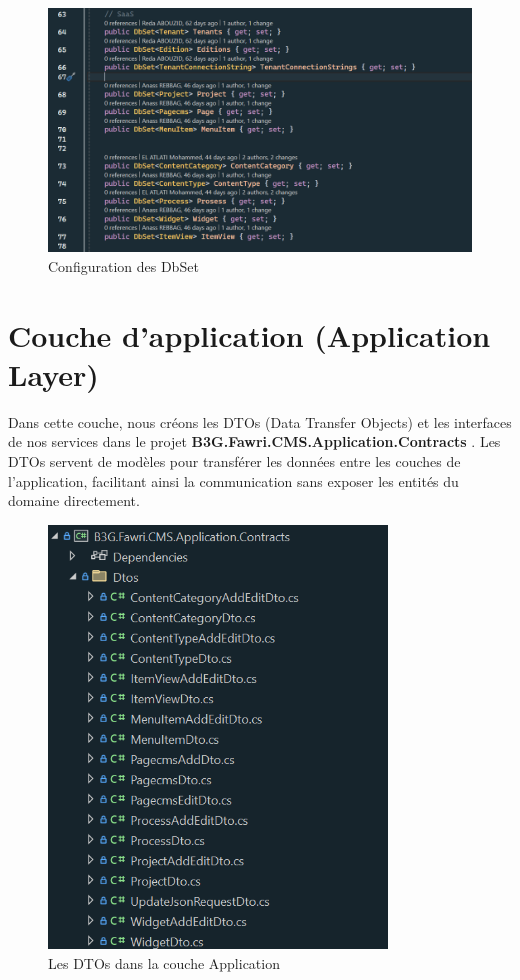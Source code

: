 \begin{figure}[H] 
    \centering
    \includegraphics[width=17cm]{Figures/db set code.PNG}
        \caption{Configuration des DbSet}
\end{figure}

\section{Couche d'application (Application Layer)}

Dans cette couche, nous créons les DTOs (Data Transfer Objects) et les interfaces de nos services dans le projet \textbf{B3G.Fawri.CMS.Application.Contracts} . Les DTOs servent de modèles pour transférer les données entre les couches de l'application, facilitant ainsi la communication sans exposer les entités du domaine directement.
\begin{figure}[H] 
    \centering
    \includegraphics[width=9cm]{Figures/dtos.PNG}
        \caption{Les DTOs dans la couche Application}
\end{figure}

